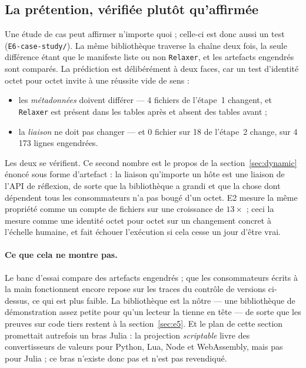 \documentclass[11pt,a4paper]{article}
\newcommand{\code}[1]{\texttt{\small #1}}
\begin{document}
\subsection{La prétention, vérifiée plutôt qu'affirmée}

Une étude de cas peut affirmer n'importe quoi ; celle-ci est donc aussi un test
(\code{E6-case-study/}). La même bibliothèque traverse la chaîne deux fois, la
seule différence étant que le manifeste liste ou non \code{Relaxer}, et les
artefacts engendrés sont comparés. La prédiction est délibérément à deux faces,
car un test d'identité octet pour octet invite à une réussite vide de sens :

\begin{itemize}\setlength{\itemsep}{1pt}
  \item les \emph{métadonnées} doivent différer --- 4 fichiers de l'étape~1
        changent, et \code{Relaxer} est présent dans les tables \og après \fg{} et
        absent des tables \og avant \fg{} ;
  \item la \emph{liaison} ne doit pas changer --- et 0 fichier sur 18 de
        l'étape~2 change, sur 4\,173 lignes engendrées.
\end{itemize}

Les deux se vérifient. Ce second nombre est le propos de la
section~\ref{sec:dynamic} énoncé sous forme d'artefact : la liaison qu'importe un
hôte est une liaison de l'API de réflexion, de sorte que la bibliothèque a grandi
et que la chose dont dépendent tous les consommateurs n'a pas bougé d'un octet.
E2 mesure la même propriété comme un compte de fichiers sur une croissance de
$13\times$ ; ceci la mesure comme une identité octet pour octet sur un changement
concret à l'échelle humaine, et fait échouer l'exécution si cela cesse un jour
d'être vrai.

\paragraph{Ce que cela ne montre pas.} Le banc d'essai compare des artefacts
engendrés ; que les consommateurs écrits à la main fonctionnent encore repose sur
les traces du contrôle de versions ci-dessus, ce qui est plus faible. La
bibliothèque est la nôtre --- une bibliothèque de démonstration assez petite pour
qu'un lecteur la tienne en tête --- de sorte que les preuves sur code tiers
restent à la section~\ref{sec:e5}. Et le plan de cette section promettait
autrefois un bras Julia : la projection \emph{scriptable} livre des convertisseurs
de valeurs pour Python, Lua, Node et WebAssembly, mais pas pour Julia ; ce bras
n'existe donc pas et n'est pas revendiqué.
\end{document}
